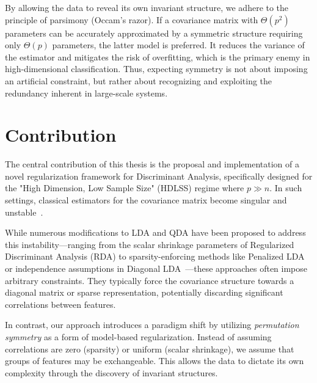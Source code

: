 \documentclass[a4paper,11pt,twoside]{report}
\theoremstyle{definition}
\begin{document}
By allowing the data to reveal its own invariant structure, we adhere to the principle of parsimony (Occam's razor). If a covariance matrix with $\Theta(p^2)$ parameters can be accurately approximated by a symmetric structure requiring only $\Theta(p)$ parameters, the latter model is preferred. It reduces the variance of the estimator and mitigates the risk of overfitting, which is the primary enemy in high-dimensional classification. Thus, expecting symmetry is not about imposing an artificial constraint, but rather about recognizing and exploiting the redundancy inherent in large-scale systems.


\section{Contribution}
\label{sec:contribution}

The central contribution of this thesis is the proposal and implementation of a novel regularization framework for Discriminant Analysis, specifically designed for the "High Dimension, Low Sample Size" (HDLSS) regime where $p \gg n$. In such settings, classical estimators for the covariance matrix become singular and unstable~\cite{bickel2004some}.

While numerous modifications to LDA and QDA have been proposed to address this instability—ranging from the scalar shrinkage parameters of Regularized Discriminant Analysis (RDA) \cite{friedman1989regularized} to sparsity-enforcing methods like Penalized LDA~\cite{witten2011penalized} or independence assumptions in Diagonal LDA~\cite{dudoit2002comparison}—these approaches often impose arbitrary constraints. They typically force the covariance structure towards a diagonal matrix or sparse representation, potentially discarding significant correlations between features.

In contrast, our approach introduces a paradigm shift by utilizing \textit{permutation symmetry} as a form of model-based regularization. Instead of assuming correlations are zero (sparsity) or uniform (scalar shrinkage), we assume that groups of features may be exchangeable. This allows the data to dictate its own complexity through the discovery of invariant structures.
\end{document}
